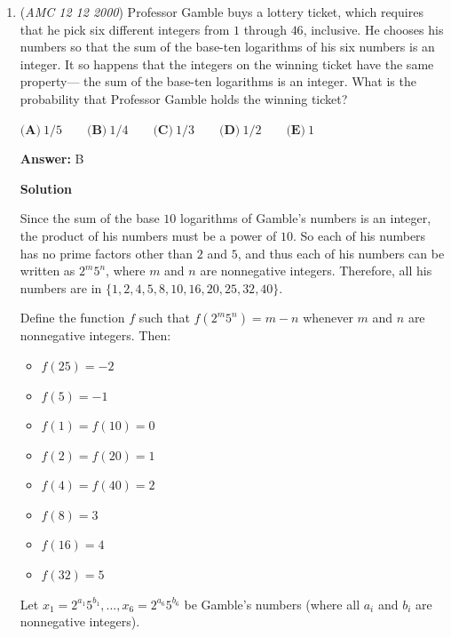 \begin{enumerate}
 Choice (B): By Vieta's rules, the product of the roots of $P$ is $d = P(0) \approx 5$.

 Choice (C): The product of the real roots of $P$ is approximately $1.5 \cdot 3.5 = 5.25$, so the product of the non-real roots is approximately $\frac{5}{5.25} < 1$.

 Choice (D): The sum of the coefficients of $P$ is $P(1) \approx 4$.

 Choice (E): The sum of the real roots of $P$ is greater than $1.5 + 3.5 = 5$.

 Therefore, the smallest of these is $\boxed{\textbf{(C)}\ \text{The\ product\ of\ the\ non-real\ zeros\ of\ } P}$.

 Edit: In  Choice (D) you have to subtract 1 because of the $x^4$ at the start.

 


	\item (\textit{AMC 12 12 2000}) Professor Gamble buys a lottery ticket, which requires that he pick six different integers from $1$  through $46$, inclusive. He chooses his numbers so that the sum of the base-ten logarithms of his six numbers is an integer. It so happens that the integers on the winning ticket have the same property— the sum of the base-ten logarithms is an integer. What is the probability that Professor Gamble holds the winning ticket?


 $\textbf {(A)}\ 1/5 \qquad \textbf {(B)}\ 1/4 \qquad \textbf {(C)}\ 1/3 \qquad \textbf {(D)}\ 1/2 \qquad \textbf {(E)}\ 1$

 \textbf{Answer: }B



\textbf{Solution}

Since the sum of the base $10$ logarithms of Gamble's numbers is an integer, the product of his numbers must be a power of $10$. So each of his numbers has no prime factors other than $2$ and $5$, and thus each of his numbers can be written as $2^m 5^n$, where $m$ and $n$ are nonnegative integers. Therefore, all his numbers are in $\{1, 2, 4, 5, 8, 10, 16, 20, 25, 32, 40\}$.

 Define the function $f$ such that $f(2^m 5^n) = m - n$ whenever $m$ and $n$ are nonnegative integers.  Then:

 
            \begin{itemize}
        \item $f(25) = -2$
        \item $f(5) = -1$
        \item $f(1) = f(10) = 0$
        \item $f(2) = f(20) = 1$
        \item $f(4) = f(40) = 2$
        \item $f(8) = 3$
        \item $f(16) = 4$
        \item $f(32) = 5$
            \end{itemize}
            Let $x_1 = 2^{a_1}5^{b_1}, ..., x_6 = 2^{a_6}5^{b_6}$ be Gamble's numbers (where all $a_i$ and $b_i$ are nonnegative integers).  


\end{enumerate}
